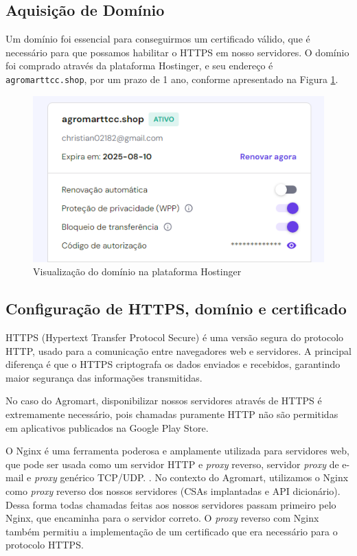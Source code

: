 \subsection{Aquisição de Domínio}
Um domínio foi essencial para conseguirmos um certificado válido, que é necessário para que possamos habilitar o HTTPS em nosso servidores. O domínio foi comprado através da plataforma Hostinger, e seu endereço é \texttt{agromarttcc.shop}, por um prazo de 1 ano, conforme apresentado na Figura \ref{dominio}. 

\begin{figure}[h]
	\centering
	\includegraphics[keepaspectratio=true,scale=0.35]{figuras/dominio.png}
	\caption{Visualização do domínio na plataforma Hostinger}
	\label{dominio}
\end{figure}

\subsection{Configuração de HTTPS, domínio e certificado}
HTTPS (Hypertext Transfer Protocol Secure) é uma versão segura do protocolo HTTP, usado para a comunicação entre navegadores web e servidores. A principal diferença é que o HTTPS criptografa os dados enviados e recebidos, garantindo maior segurança das informações transmitidas.

No caso do Agromart, disponibilizar nossos servidores através de HTTPS é extremamente necessário, pois chamadas puramente HTTP não são permitidas em aplicativos publicados na Google Play Store.

O Nginx é uma ferramenta poderosa e amplamente utilizada para servidores web, que pode ser usada como um servidor HTTP e \textit{proxy} reverso, servidor \textit{proxy} de e-mail e \textit{proxy} genérico TCP/UDP. \cite{nginx2024}. No contexto do Agromart, utilizamos o Nginx como \textit{proxy} reverso dos nossos servidores (CSAs implantadas e API dicionário). Dessa forma todas chamadas feitas aos nossos servidores passam primeiro pelo Nginx, que encaminha para o servidor correto. O \textit{proxy} reverso com Nginx também permitiu a implementação de um certificado que era necessário para o protocolo HTTPS.

